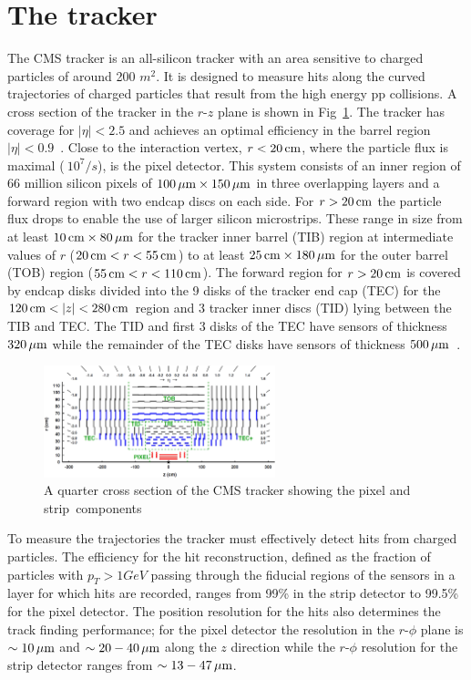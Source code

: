 \section{The tracker}
The CMS tracker is an all-silicon tracker with an area sensitive to charged particles of around 200 $m^2$. It is designed to measure hits along the
curved trajectories of charged particles that result from the high energy pp collisions. A cross section of the tracker in the $r$-$z$ plane is shown in Fig~\ref{TRACKER_SLICE}.
The tracker has coverage for $|\eta| < 2.5$ and achieves an optimal efficiency in the barrel region $|\eta| < 0.9$~\cite{tracker_performance,tracker_tdr}. 
Close to the interaction vertex, $r < 20\,\text{cm}$, where the particle flux is maximal ($~10^7/s$), is the pixel detector. This system consists of an inner region of 66 million silicon 
pixels of $100\,\mu\text{m} \times 150\,\mu\text{m}$ in three overlapping layers and a forward region with two endcap discs on each side.
For $r > 20\,\text{cm}$ the particle flux drops to enable the use of larger silicon microstrips. These range in size from at least $10 \,\text{cm} \times 80 \,\mu\text{m}$ for the 
tracker inner barrel (TIB) region 
at intermediate values of $r$ ($20\,\text{cm} < r < 55\,\text{cm}$) to at least $25\,\text{cm} \times 180\,\mu\text{m}$ for the outer barrel (TOB) region ($55 \,\text{cm} < r < 110 \,\text{cm}$). The forward region
for $r > 20\,\text{cm}$ is covered by endcap disks divided into the 9 disks of the tracker end cap (TEC) for the $120 \,\text{cm} < |z| < 280 \,\text{cm}$ region and 
3 tracker inner discs (TID) lying between the TIB and TEC. The TID and first 3 disks of the TEC have sensors of thickness $320\,\mu\text{m}$ while the remainder of the TEC disks
have sensors of thickness $500\,\mu\text{m}$~\cite{tracker_tdr}.

\begin{figure}
\centering
    \includegraphics[width=0.6\textwidth]{./Figures/detector/CMS2Dtracker}
  \caption{A quarter cross section of the CMS tracker showing the pixel and strip~components~\cite{tracker_fig}}
  \label{TRACKER_SLICE}
\end{figure}

To measure the trajectories the tracker must effectively detect hits from charged particles. The efficiency for the 
hit reconstruction, defined as the fraction of particles with $p_T > 1 GeV$ passing through the fiducial regions of the sensors
in a layer for which hits are recorded, ranges from 99\% in the strip detector to 99.5\% for the pixel detector.
The position resolution for the hits also determines the track finding performance; for
the pixel detector the resolution in the $r$-$\phi$ plane is $\sim10\,\mu\text{m}$ and $\sim20-40\,\mu\text{m}$ along
the $z$ direction while the $r$-$\phi$ resolution for the strip detector ranges from $\sim13-47\,\mu\text{m}$.

